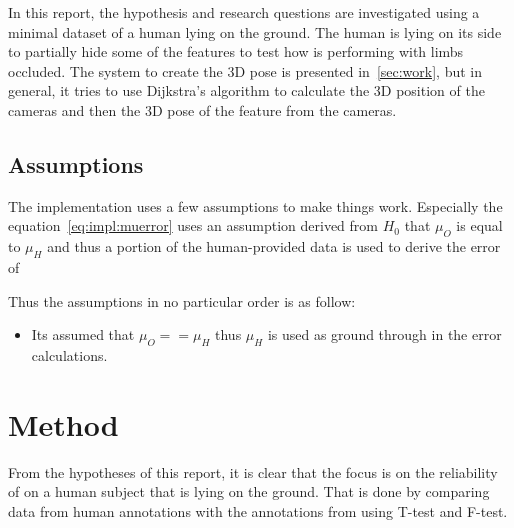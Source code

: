 In this report, the hypothesis and research questions are investigated using a minimal dataset of a human lying on the ground.
The human is lying on its side to partially hide some of the features to test how \openpose{ } is performing with limbs occluded.
The system to create the 3D pose is presented in~\ref{sec:work}, but in general, it tries to use Dijkstra's algorithm to calculate the 3D position of the cameras and then the 3D pose of the feature from the cameras.






\subsection{Assumptions}%
\label{sub:assumptions}
The implementation uses a few assumptions to make things work.
Especially the equation~\ref{eq:impl:muerror} uses an assumption derived from $H_0$ that $\mu_O$ is equal to $\mu_H$ and
thus a portion of the human-provided data is used to derive the error of 

\noindent
Thus the assumptions in no particular order is as follow:
\begin{itemize}
    \item Its assumed that $\mu_O == \mu_H$ thus $\mu_H$ is used as ground through in the error calculations.
\end{itemize}


\section{Method}
\label{sec:method}
From the hypotheses of this report, it is clear that the focus is on the reliability of \openpose{ } on a human subject that is lying on the ground.
That is done by comparing data from human annotations with the annotations from \operpose{} using T-test and F-test.

